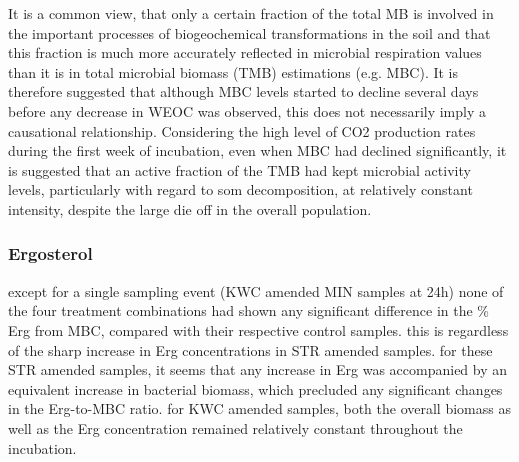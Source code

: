 	It is a common view, that only a certain fraction of the total MB  is involved in the important processes of biogeochemical transformations in the soil \citep{blagodatskaya2013, salazar-villegas2016} and that this fraction is much more accurately reflected in microbial respiration values than it is in total microbial biomass (TMB) estimations (e.g. MBC)\citep{salazar-villegas2016}. It is therefore suggested that although MBC levels started to decline several days before any decrease in WEOC was observed, this does not necessarily imply a causational relationship. Considering the high level of CO2 production rates during the first week of incubation, even when MBC had declined significantly, it is suggested that an active fraction of the TMB had kept microbial activity levels, particularly with regard to \gls{som} decomposition, at relatively constant intensity, despite the large die off in the overall population. \\


		\subsubsection{Ergosterol}

			except for a single sampling event (KWC amended MIN samples at 24h) none of the four treatment combinations had shown any significant difference in the \% Erg from MBC, compared with their respective control samples. this is regardless of the sharp increase in Erg concentrations in STR amended samples. for these STR amended samples, it seems that any increase in Erg was accompanied by an equivalent increase in bacterial biomass, which precluded any significant changes in the Erg-to-MBC ratio. for KWC amended samples, both the overall biomass as well as the Erg concentration remained relatively constant throughout the incubation. \\


